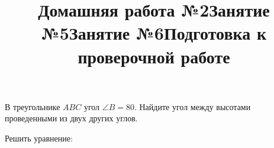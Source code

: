 \newpage
\title{Домашняя работа №2}
\begin{listofex}
	\item {}
	\item {}
	\item {}
	\item {}
	\item {}
	\item {}
	\item В треугольнике \( ABC \) угол \( \angle B = 80 \). Найдите угол между высотами проведенными из двух других углов. 
	\item Решить уравнение:
	\begin{enumcols}[itemcolumns=2]
		\item {}
		\item {}
\end{enumcols}
\end{listofex}
\newpage
\title{Занятие №5}
\begin{listofex}
	\item {}
	\item {}
	\item {}
	\item {}
	\item {}
	\item {}
	\item {}
	\item {}
\end{listofex}
\newpage
\title{Занятие №6}
\begin{listofex}
	\item {}
	\item {}
	\item {}
	\item {}
	\item {}
	\item {}
	\item {}
	\item {}
\end{listofex}
%	
\newpage
\title{Подготовка к проверочной работе}
